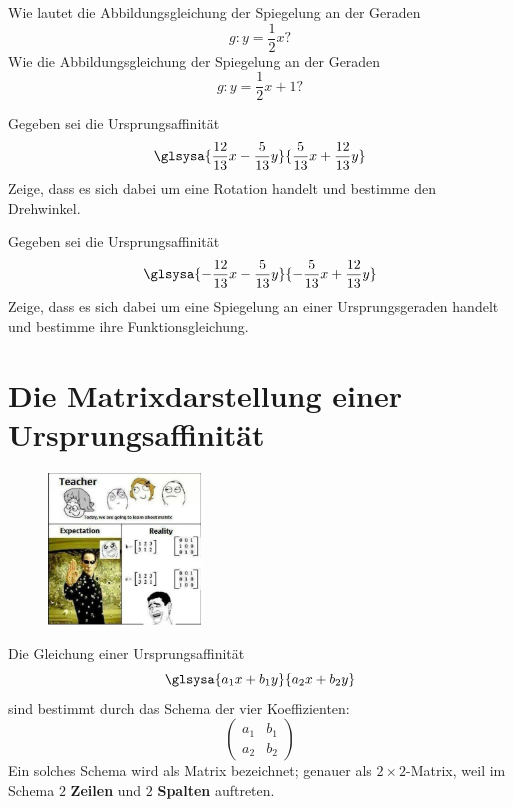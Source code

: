 \documentclass[%
11pt,%
twoside,%
titlepage,%
german,%
headsepline%
]{scrartcl}
\begin{document}
\begin{ueb}
Wie lautet die Abbildungsgleichung der Spiegelung an der Geraden
$$g : y = \frac{1}{2}x?$$
Wie die Abbildungsgleichung der Spiegelung an der Geraden
$$g:y=\frac{1}{2}x+1?$$
\end{ueb}

\begin{ueb}
Gegeben sei die Ursprungsaffinität
$$\glsysa{\frac{12}{13}x-\frac{5}{13}y}{\frac{5}{13}x+\frac{12}{13}y}$$
Zeige, dass es sich dabei um eine Rotation handelt und bestimme den Drehwinkel.
\end{ueb}

\begin{ueb}
Gegeben sei die Ursprungsaffinität
$$\glsysa{-\frac{12}{13}x-\frac{5}{13}y}{-\frac{5}{13}x+\frac{12}{13}y}$$
Zeige, dass es sich dabei um eine Spiegelung an einer Ursprungsgeraden handelt und bestimme ihre Funktionsgleichung.
\end{ueb}

\pagebreak

\section{Die Matrixdarstellung einer Ursprungsaffinität}
\begin{figure}
\vspace{-22pt}
\begin{center}
\includegraphics[width=0.36\textwidth]{matrixjoke.jpg}
\end{center}
\vspace{-22pt}
\end{figure}
Die Gleichung einer Ursprungsaffinität
$$\glsysa{a_1x+b_1y}{a_2x+b_2y}$$
sind bestimmt durch das Schema der vier Koeffizienten:
$$
\begin{pmatrix}
a_1 & b_1\\
a_2 & b_2
\end{pmatrix}
$$
Ein solches Schema wird als Matrix bezeichnet; genauer als $2\times2$-Matrix, weil im Schema $2$ \textbf{Zeilen} und $2$ \textbf{Spalten} auftreten.
\end{document}

